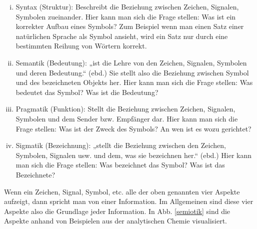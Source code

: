  
\begin{enumerate}[(i)]

\item
Syntax (Struktur): Beschreibt die Beziehung zwischen Zeichen, Signalen, Symbolen zueinander. Hier kann man sich die Frage stellen: Was ist ein korrekter Aufbau eines Symbols? Zum Beispiel wenn man einen Satz einer natürlichen Sprache als Symbol ansieht, wird ein Satz nur durch eine bestimmten Reihung von Wörtern korrekt.


\item
Semantik (Bedeutung): „ist die Lehre von den Zeichen, Signalen, Symbolen und deren Bedeutung.“ (ebd.) Sie stellt also die Beziehung zwischen Symbol und des bezeichneten Objekts her. Hier kann man sich die Frage stellen: Was bedeutet das Symbol? Was ist die Bedeutung?


\item
Pragmatik (Funktion): Stellt die Beziehung zwischen Zeichen, Signalen, Symbolen und dem Sender bzw. Empfänger dar. Hier kann man sich die Frage stellen: Was ist der Zweck des Symbols? An wen ist es wozu gerichtet?


\item
Sigmatik (Bezeichnung): „stellt die Beziehung zwischen den Zeichen, Symbolen, Signalen usw. und dem, was sie bezeichnen her.“ (ebd.) Hier kann man sich die Frage stellen: Was bezeichnet das Symbol? Was ist das Bezeichnete?


\end{enumerate}
 
Wenn ein Zeichen, Signal, Symbol, etc. alle der oben genannten vier Aspekte aufzeigt, dann spricht man von einer Information. Im Allgemeinen sind diese vier Aspekte also die Grundlage jeder Information. In Abb. \ref{semiotik} sind die Aspekte anhand von Beispielen aus der analytischen Chemie visualisiert.

